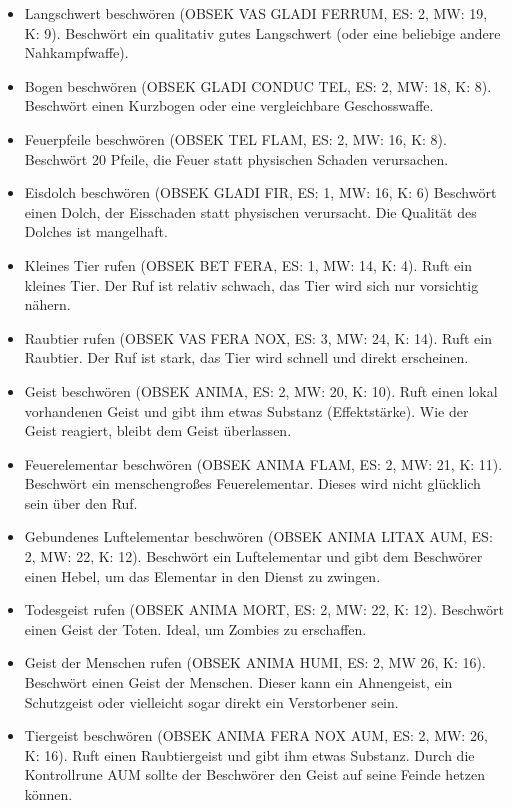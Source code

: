 \documentclass{article}
\begin{document}
\begin{itemize}
\item Langschwert beschwören (OBSEK VAS GLADI FERRUM, ES: 2, MW: 19, K: 9). Beschwört ein qualitativ gutes Langschwert (oder eine beliebige andere Nahkampfwaffe).
\item Bogen beschwören (OBSEK GLADI CONDUC TEL, ES: 2, MW: 18, K: 8). Beschwört einen Kurzbogen oder eine vergleichbare Geschosswaffe.
\item Feuerpfeile beschwören (OBSEK TEL FLAM, ES: 2, MW: 16, K: 8). Beschwört 20 Pfeile, die Feuer statt physischen Schaden verursachen.
\item Eisdolch beschwören (OBSEK GLADI FIR, ES: 1, MW: 16, K: 6) Beschwört einen Dolch, der Eisschaden statt physischen verursacht. Die Qualität des Dolches ist mangelhaft.
\item Kleines Tier rufen (OBSEK BET FERA, ES: 1, MW: 14, K: 4). Ruft ein kleines Tier. Der Ruf ist relativ schwach, das Tier wird sich nur vorsichtig nähern.
\item Raubtier rufen (OBSEK VAS FERA NOX, ES: 3, MW: 24, K: 14). Ruft ein Raubtier. Der Ruf ist stark, das Tier wird schnell und direkt erscheinen.
\item Geist beschwören (OBSEK ANIMA, ES: 2, MW: 20, K: 10). Ruft einen lokal vorhandenen Geist und gibt ihm etwas Substanz (Effektstärke). Wie der Geist reagiert, bleibt dem Geist überlassen.
\item Feuerelementar beschwören (OBSEK ANIMA FLAM, ES: 2, MW: 21, K: 11). Beschwört ein menschengroßes Feuerelementar. Dieses wird nicht glücklich sein über den Ruf.
\item Gebundenes Luftelementar beschwören (OBSEK ANIMA LITAX AUM, ES: 2, MW: 22, K: 12). Beschwört ein Luftelementar und gibt dem Beschwörer einen Hebel, um das Elementar in den Dienst zu zwingen.
\item Todesgeist rufen (OBSEK ANIMA MORT, ES: 2, MW: 22, K: 12). Beschwört einen Geist der Toten. Ideal, um Zombies zu erschaffen.
\item Geist der Menschen rufen (OBSEK ANIMA HUMI, ES: 2, MW 26, K: 16). Beschwört einen Geist der Menschen. Dieser kann ein Ahnengeist, ein Schutzgeist oder vielleicht sogar direkt ein Verstorbener sein.
\item Tiergeist beschwören (OBSEK ANIMA FERA NOX AUM, ES: 2, MW: 26, K: 16). Ruft einen Raubtiergeist und gibt ihm etwas Substanz. Durch die Kontrollrune AUM sollte der Beschwörer den Geist auf seine Feinde hetzen können.
\end{itemize}
\end{document}
